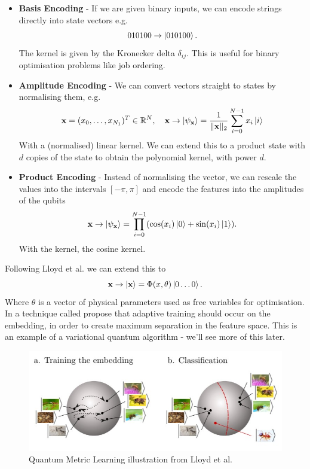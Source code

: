\documentclass{article}
\theoremstyle{definition}
\begin{document}
\begin{itemize}
    \item \textbf{Basis Encoding} - If we are given binary inputs, we can encode strings directly into state vectors e.g.
    \[
    010100 \to \ket{010100}.
    \]
    The kernel is given by the Kronecker delta $\delta_{ij}$. This is useful for binary optimisation problems like job ordering. 
    \item \textbf{Amplitude Encoding} - We can convert vectors straight to states by normalising them, e.g. 
    \[
    \mathbf{x} = (x_0 , \ldots, x_{N_1} )^T \in \mathbb{R}^N, \quad \mathbf{x} \to \ket{\psi_{\mathbf{x}}} = \frac{1}{\| \mathbf{x}\|_2} \sum_{i = 0}^{N-1} x_i \ket{i}
    \]
    With a (normalised) linear kernel. We can extend this to a product state with $d$ copies of the state to obtain the polynomial kernel, with power $d$.
    \item \textbf{Product Encoding} - Instead of normalising the vector, we can rescale the values into the intervals $[-\pi, \pi]$ and encode the features into the amplitudes of the qubits
    \[
    \mathbf{x} \to \ket{\psi_{\mathbf{x}}} = \prod_{i=0}^{N-1} (\cos (x_i) \ket{0} + \sin (x_i) \ket{1}).
    \]
    With the kernel, the cosine kernel. 
\end{itemize}

Following Lloyd et al. \cite{lloyd2020quantum} we can extend this to 
\[
\mathbf{x} \to \ket{\mathbf{x}} = \Phi(x, \theta) \ket{0 \ldots 0}.
\]
Where $\theta$ is a vector of physical parameters used as free variables for optimisation. In a technique called  propose that adaptive training should occur on the embedding, in order to create maximum separation in the feature space. This is an example of a variational quantum algorithm - we'll see more of this later.

\begin{figure}[htb]
    \centering
    \includegraphics{Quantum Metric Learning.jpg}
    \caption{Quantum Metric Learning illustration from Lloyd et al. \cite{lloyd2020quantum}}
    \label{fig:quantum_metric_learning}
\end{figure}
\end{document}
